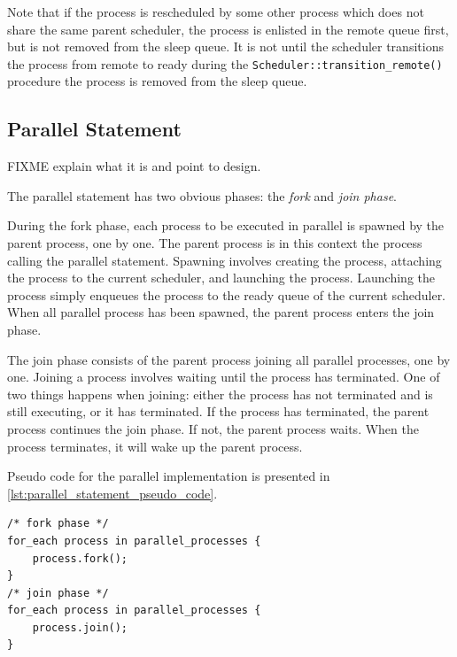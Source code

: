 Note that if the process is rescheduled by some other process which does not share the same parent scheduler, the process is enlisted in the remote queue first, but is not removed from the sleep queue. It is not until the scheduler transitions the process from remote to ready during the \texttt{Scheduler::transition\_remote()} procedure the process is removed from the sleep queue.


\subsection{Parallel Statement}

FIXME explain what it is and point to design.

The parallel statement has two obvious phases: the \textit{fork} and \textit{join phase}. 

During the fork phase, each process to be executed in parallel is spawned by the parent process, one by one. The parent process is in this context the process calling the parallel statement. Spawning involves creating the process, attaching the process to the current scheduler, and launching the process. Launching the process simply enqueues the process to the ready queue of the current scheduler. When all parallel process has been spawned, the parent process enters the join phase.

The join phase consists of the parent process joining all parallel processes, one by one. Joining a process involves waiting until the process has terminated. One of two things happens when joining: either the process has not terminated and is still executing, or it has terminated. If the process has terminated, the parent process continues the join phase. If not, the parent process waits. When the process terminates, it will wake up the parent process.

Pseudo code for the parallel implementation is presented in \cref{lst:parallel_statement_pseudo_code}.

\begin{lstfloat}
\begin{lstlisting}[caption={Parallel statement pseudo code.}, label={lst:parallel_statement_pseudo_code}, style={CustomC++}, xleftmargin={2em}]
/* fork phase */
for_each process in parallel_processes {
    process.fork();
}
/* join phase */
for_each process in parallel_processes {
    process.join();
}
\end{lstlisting}
\end{lstfloat}

